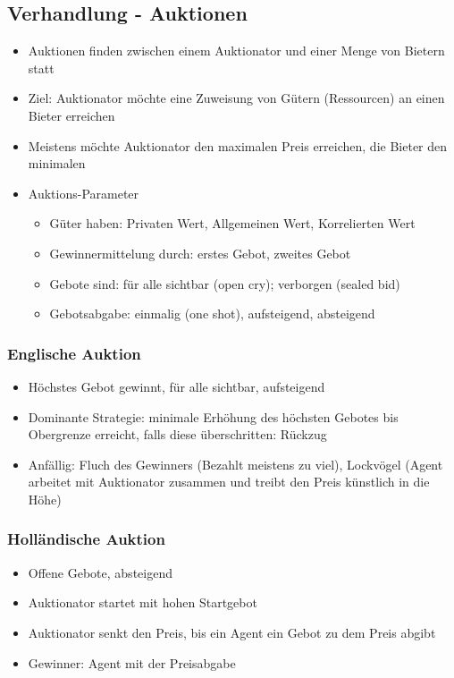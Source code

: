 \documentclass{article} %
\begin{document}
	\subsection{Verhandlung - Auktionen}
	\begin{itemize}
		\item Auktionen finden zwischen einem Auktionator und einer Menge von Bietern statt
		\item Ziel: Auktionator möchte eine Zuweisung von Gütern (Ressourcen) an einen Bieter erreichen
		\item Meistens möchte Auktionator den maximalen Preis erreichen, die Bieter den minimalen
		\item Auktions-Parameter
		\begin{itemize}
			\item Güter haben: Privaten Wert, Allgemeinen Wert, Korrelierten Wert
			\item Gewinnermittelung durch: erstes Gebot, zweites Gebot
			\item Gebote sind: für alle sichtbar (open cry); verborgen (sealed bid)
			\item Gebotsabgabe: einmalig (one shot), aufsteigend, absteigend
		\end{itemize}
	\end{itemize}
	\subsubsection{Englische Auktion}
	\begin{itemize}
		\item Höchstes Gebot gewinnt, für alle sichtbar, aufsteigend
		\item Dominante Strategie: minimale Erhöhung des höchsten Gebotes bis Obergrenze erreicht, falls diese überschritten: Rückzug
		\item Anfällig: Fluch des Gewinners (Bezahlt meistens zu viel), Lockvögel (Agent arbeitet mit Auktionator zusammen und treibt den Preis künstlich in die Höhe)
	\end{itemize}
	\subsubsection{Holländische Auktion}
	\begin{itemize}
		\item Offene Gebote, absteigend
		\item Auktionator startet mit hohen Startgebot
		\item Auktionator senkt den Preis, bis ein Agent ein Gebot zu dem Preis abgibt
		\item Gewinner: Agent mit der Preisabgabe
	\end{itemize}
\end{document}
